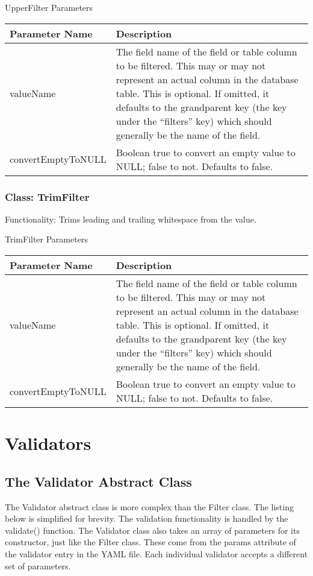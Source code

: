 \documentclass[letterpaper,10pt,english]{sphinxmanual}
\begin{document}
UpperFilter Parameters

\begin{tabulary}{\linewidth}{|L|L|}
\hline
\textsf{\relax 
Parameter Name
} & \textsf{\relax 
Description
}\\
\hline
valueName
 & 
The field name of the field or table column to be filtered.  This may or may not
represent an actual column in the database table.  This is optional.  If omitted,
it defaults to the grandparent key (the key under the ``filters'' key) which should
generally be the name of the field.
\\
\hline
convertEmptyToNULL
 & 
Boolean true to convert an empty value to NULL; false to not.  Defaults to false.
\\
\hline\end{tabulary}



\subsubsection{Class: TrimFilter}
\label{jaxFrameworkGuide:class-trimfilter}
Functionality: Trims leading and trailing whitespace from the value.

TrimFilter Parameters

\begin{tabulary}{\linewidth}{|L|L|}
\hline
\textsf{\relax 
Parameter Name
} & \textsf{\relax 
Description
}\\
\hline
valueName
 & 
The field name of the field or table column to be filtered.  This may or may not
represent an actual column in the database table.  This is optional.  If omitted,
it defaults to the grandparent key (the key under the ``filters'' key) which should
generally be the name of the field.
\\
\hline
convertEmptyToNULL
 & 
Boolean true to convert an empty value to NULL; false to not.  Defaults to false.
\\
\hline\end{tabulary}



\section{Validators}
\label{jaxFrameworkGuide:validators}

\subsection{The Validator Abstract Class}
\label{jaxFrameworkGuide:the-validator-abstract-class}
The Validator abstract class is more complex than the Filter class.  The listing below is simplified
for brevity.  The validation functionality is handled by the validate() function.  The Validator
class also takes an array of parameters for its constructor, just like the Filter class.  These come
from the params attribute of the validator entry in the YAML file.  Each individual validator
accepts a different set of parameters.
\end{document}
